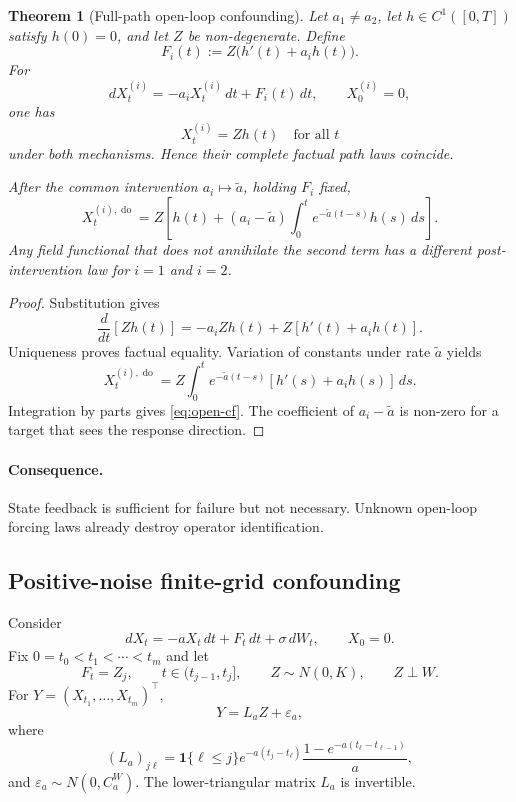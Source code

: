 \documentclass[11pt]{article}
\newtheorem{theorem}[assumption]{Theorem}
\theoremstyle{remark}
\newcommand{\ind}{\mathbf 1}
\newcommand{\doop}{\operatorname{do}}
\begin{document}
\begin{theorem}[Full-path open-loop confounding]\label{thm:open-path}
Let $a_1\neq a_2$, let $h\in C^1([0,T])$ satisfy $h(0)=0$, and let $Z$ be non-degenerate. Define
\[
 F_i(t):=Z\bigl(h'(t)+a_ih(t)\bigr).
\]
For
\[
 dX_t^{(i)}
 =
 -a_iX_t^{(i)}\,dt+F_i(t)\,dt,
 \qquad X_0^{(i)}=0,
\]
one has
\[
 X_t^{(i)}=Zh(t)
 \quad\text{for all }t
\]
under both mechanisms. Hence their complete factual path laws coincide.

After the common intervention $a_i\mapsto\widetilde a$, holding $F_i$ fixed,
\begin{equation}\label{eq:open-cf}
 X_t^{(i),\doop}
 =
 Z\left[
 h(t)
 +(a_i-\widetilde a)
 \int_0^t e^{-\widetilde a(t-s)}h(s)\,ds
 \right].
\end{equation}
Any field functional that does not annihilate the second term has a different post-intervention law for $i=1$ and $i=2$.
\end{theorem}

\begin{proof}
Substitution gives
\[
 \frac{d}{dt}[Zh(t)]
 =
 -a_iZh(t)+Z[h'(t)+a_ih(t)].
\]
Uniqueness proves factual equality. Variation of constants under rate $\widetilde a$ yields
\[
 X_t^{(i),\doop}
 =
 Z\int_0^t e^{-\widetilde a(t-s)}
 [h'(s)+a_ih(s)]\,ds.
\]
Integration by parts gives \eqref{eq:open-cf}. The coefficient of $a_i-\widetilde a$ is non-zero for a target that sees the response direction.
\end{proof}

\paragraph{Consequence.}
State feedback is sufficient for failure but not necessary. Unknown open-loop forcing laws already destroy operator identification.

\subsection{Positive-noise finite-grid confounding}

Consider
\begin{equation}\label{eq:open-grid}
 dX_t=-aX_t\,dt+F_t\,dt+\sigma\,dW_t,
 \qquad X_0=0.
\end{equation}
Fix $0=t_0<t_1<\cdots<t_m$ and let
\[
 F_t=Z_j,\qquad t\in(t_{j-1},t_j],
 \qquad
 Z\sim N(0,K),
 \qquad
 Z\perp W.
\]
For $Y=(X_{t_1},\ldots,X_{t_m})^\top$,
\[
 Y=L_aZ+\varepsilon_a,
\]
where
\begin{equation}\label{eq:L}
 (L_a)_{j\ell}
 =
 \ind\{\ell\le j\}
 e^{-a(t_j-t_\ell)}
 \frac{1-e^{-a(t_\ell-t_{\ell-1})}}{a},
\end{equation}
and $\varepsilon_a\sim N(0,C_a^W)$. The lower-triangular matrix $L_a$ is invertible.
\end{document}
